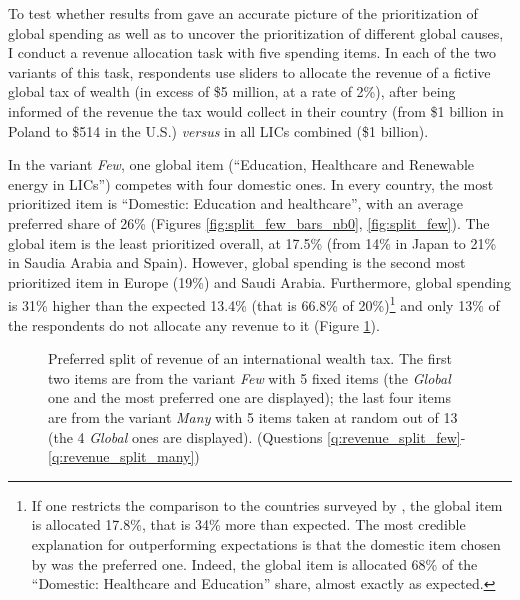 \documentclass[12pt,english]{article}
\begin{document}
\begin{bibunit}
To test whether results from \citep{fabre_majority_2025} gave an accurate picture of the %
prioritization of global spending as well as to uncover the prioritization of different global causes, I conduct a revenue allocation task with five spending items. 
In each of the two variants of this task, respondents use sliders to allocate the revenue of a fictive global tax of wealth (in excess of \$5 million, at a rate of 2\%), after being informed of the revenue the tax would collect in their country (from \$1 billion in Poland to \$514 in the U.S.) \textit{versus} in all LICs combined (\$1 billion). 

In the variant \textit{Few}, one global item (``Education, Healthcare and Renewable energy in LICs'') competes with four domestic ones. %
In every country, the most prioritized item is ``Domestic: Education and healthcare'', with an average preferred share of 26\% (Figures \ref{fig:split_few_bars_nb0}, \ref{fig:split_few}). The global item is the least prioritized overall, at 17.5\% (from 14\% in Japan to 21\% in Saudia Arabia and Spain). However, global spending is the second most prioritized item in Europe (19\%) and Saudi Arabia. Furthermore, global spending is 31\% higher than the expected 13.4\% (that is 66.8\% of %
20\%)\footnote{If one restricts the comparison to the countries surveyed by \citep{fabre_majority_2025}, the global item is allocated 17.8\%, that is 34\% more than expected. The most credible explanation for outperforming expectations is that the domestic item chosen by \citep{fabre_majority_2025} was the preferred one. Indeed, the global item is allocated 68\% of the ``Domestic: Healthcare and Education'' share, almost exactly as expected.} and only 13\% of the respondents do not allocate any revenue to it (Figure \ref{fig:split}). 


\begin{figure}[h!]
  \caption[Preferred split of revenue of an international wealth tax]{Preferred split of revenue of an international wealth tax. The first two items are from the variant \textit{Few} with 5 fixed items (the \textit{Global} one and the most preferred one are displayed); the last four items are from the variant \textit{Many} with 5 items taken at random out of 13 (the 4 \textit{Global} ones are displayed). \hfill (Questions \ref{q:revenue_split_few}-\ref{q:revenue_split_many})} \label{fig:split}


\end{figure}
\end{bibunit}
\end{document}
